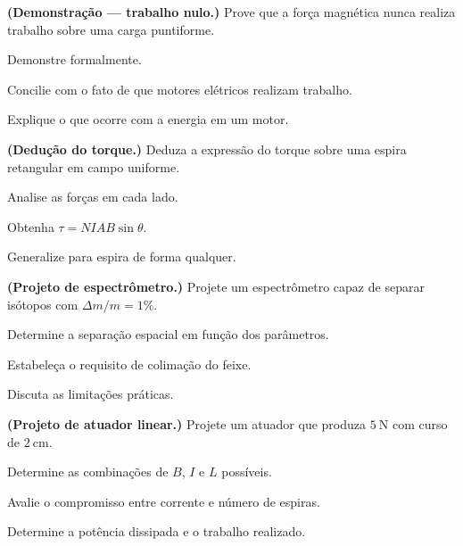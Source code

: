 \blocodesafio
\begin{questao}[4]{}

\textbf{(Demonstração --- trabalho nulo.)} Prove que a força magnética nunca
realiza trabalho sobre uma carga puntiforme.
\begin{itensq}
\item Demonstre formalmente.
\item Concilie com o fato de que motores elétricos realizam trabalho.
\item Explique o que ocorre com a energia em um motor.
\end{itensq}


\end{questao}
\begin{questao}[4]{}

\textbf{(Dedução do torque.)} Deduza a expressão do torque sobre uma espira
retangular em campo uniforme.
\begin{itensq}
\item Analise as forças em cada lado.
\item Obtenha $\tau=NIAB\sin\theta$.
\item Generalize para espira de forma qualquer.
\end{itensq}


\end{questao}
\begin{questao}[4]{}

\textbf{(Projeto de espectrômetro.)} Projete um espectrômetro capaz de separar
isótopos com $\Delta m/m=1\%$.
\begin{itensq}
\item Determine a separação espacial em função dos parâmetros.
\item Estabeleça o requisito de colimação do feixe.
\item Discuta as limitações práticas.
\end{itensq}


\end{questao}
\begin{questao}[4]{}

\textbf{(Projeto de atuador linear.)} Projete um atuador que produza
$\SI{5}{\newton}$ com curso de $\SI{2}{\centi\meter}$.
\begin{itensq}
\item Determine as combinações de $B$, $I$ e $L$ possíveis.
\item Avalie o compromisso entre corrente e número de espiras.
\item Determine a potência dissipada e o trabalho realizado.
\end{itensq}


\end{questao}

